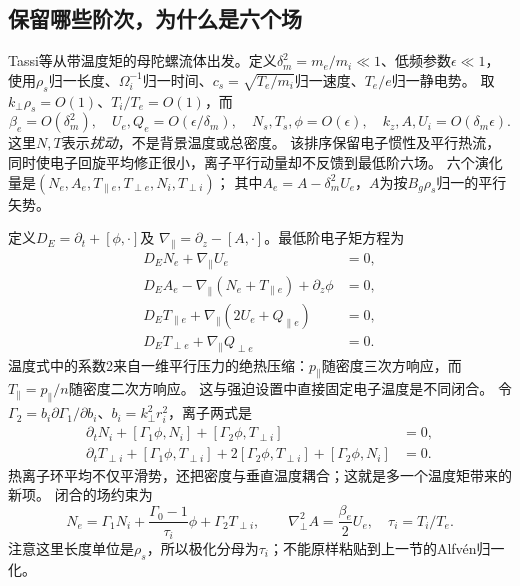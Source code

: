 \subsection{保留哪些阶次，为什么是六个场}
Tassi等从带温度矩的母陀螺流体出发。定义$\delta_m^2=m_e/m_i\ll1$、低频参数$\epsilon\ll1$，
使用$\rho_s$归一长度、$\Omega_i^{-1}$归一时间、$c_s=\sqrt{T_e/m_i}$归一速度、$T_e/e$归一静电势。
取$k_\perp\rho_s=O(1)$、$T_i/T_e=O(1)$，而
\begin{equation}
 \beta_e=O(\delta_m^2),\quad
 U_e,Q_e=O(\epsilon/\delta_m),\quad
 N_s,T_s,\phi=O(\epsilon),\quad
 k_z,A,U_i=O(\delta_m\epsilon).
\end{equation}
这里$N,T$表示\emph{扰动}，不是背景温度或总密度。
该排序保留电子惯性及平行热流，同时使电子回旋平均修正很小，离子平行动量却不反馈到最低阶六场。
六个演化量是$(N_e,A_e,T_{\parallel e},T_{\perp e},N_i,T_{\perp i})$；
其中$A_e=A-\delta_m^2U_e$，$A$为按$B_g\rho_s$归一的平行矢势。\citep{L244}

定义$D_E=\partial_t+[\phi,\cdot]$及
$\nabla_\parallel=\partial_z-[A,\cdot]$。最低阶电子矩方程为
\begin{align}
 D_EN_e+\nabla_\parallel U_e&=0,\\
 D_EA_e-\nabla_\parallel(N_e+T_{\parallel e})+\partial_z\phi&=0,\\
 D_ET_{\parallel e}+\nabla_\parallel(2U_e+Q_{\parallel e})&=0,\\
 D_ET_{\perp e}+\nabla_\parallel Q_{\perp e}&=0.
 \label{eq:landau_e}
\end{align}
温度式中的系数2来自一维平行压力的绝热压缩：$p_\parallel$随密度三次方响应，而$T_\parallel=p_\parallel/n$随密度二次方响应。
这与强迫设置中直接固定电子温度是不同闭合。
令$\Gamma_2=b_i\partial\Gamma_1/\partial b_i$、$b_i=k_\perp^2r_i^2$，离子两式是
\begin{align}
 \partial_tN_i+[\Gamma_1\phi,N_i]+[\Gamma_2\phi,T_{\perp i}]&=0,\\
 \partial_tT_{\perp i}+[\Gamma_1\phi,T_{\perp i}]
 +2[\Gamma_2\phi,T_{\perp i}]+[\Gamma_2\phi,N_i]&=0.
\end{align}
热离子环平均不仅平滑势，还把密度与垂直温度耦合；这就是多一个温度矩带来的新项。
闭合的场约束为
\begin{equation}
 N_e=\Gamma_1N_i+\frac{\Gamma_0-1}{\tau_i}\phi
           +\Gamma_2T_{\perp i},\qquad
 \nabla_\perp^2A=\frac{\beta_e}{2}U_e,\quad\tau_i=T_i/T_e.
\end{equation}
注意这里长度单位是$\rho_s$，所以极化分母为$\tau_i$；不能原样粘贴到上一节的Alfvén归一化。

